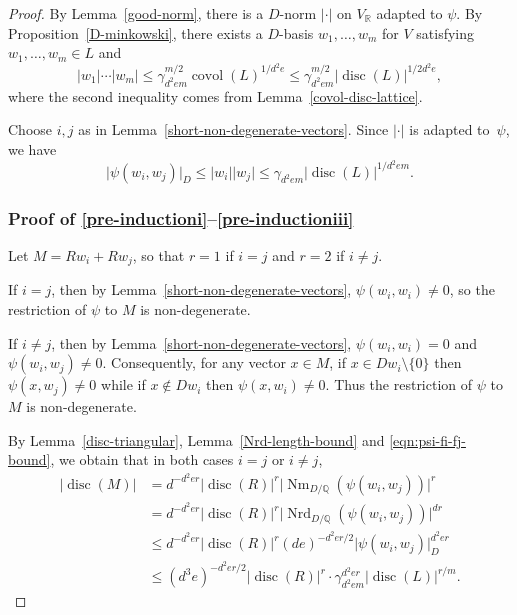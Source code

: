 \documentclass[11pt]{article}
\numberwithin{equation}{section}
\newcommand{\bQ}{\mathbb{Q}}
\newcommand{\bR}{\mathbb{R}}
\DeclareMathOperator{\covol}{covol}
\DeclareMathOperator{\disc}{disc}
\DeclareMathOperator{\Nm}{Nm}
\DeclareMathOperator{\Nrd}{Nrd}
\newcommand{\abs}[1]{\lvert #1 \rvert}
\begin{document}
\begin{proof}
By Lemma~\ref{good-norm}, there is a $D$-norm $\abs{\cdot}$ on $V_\bR$ adapted to $\psi$.
By Proposition~\ref{D-minkowski}, there exists a $D$-basis $w_1, \dotsc, w_m$ for $V$ satisfying $w_1, \dotsc, w_m \in L$ and\vspace*{-3pt}
\[
\abs{w_1} \dotsm \abs{w_m} \leq \gamma_{d^2em}^{m/2} \covol(L)^{1/d^2e} \leq \gamma_{d^2em}^{m/2} \abs{\disc(L)}^{1/2d^2e},
\]
where the second inequality comes from Lemma~\ref{covol-disc-lattice}.

Choose $i, j$ as in Lemma~\ref{short-non-degenerate-vectors}.
Since $\abs{\cdot}$ is adapted to~$\psi$, we have\vspace*{-3pt}
\begin{equation} \label{eqn:psi-fi-fj-bound}
\abs{\psi(w_i, w_j)}_D \leq \abs{w_i}\abs{w_j} \leq \gamma_{d^2em} \abs{\disc(L)}^{1/d^2em}.
\end{equation}

\subsubsection*{Proof of \eqref{pre-inductioni}--\eqref{pre-inductioniii}}

Let $M = Rw_i + Rw_j$, so that $r=1$ if $i=j$ and $r=2$ if $i \neq j$.

If $i=j$, then by Lemma~\ref{short-non-degenerate-vectors}, $\psi(w_i, w_i) \neq 0$, so the restriction of $\psi$ to $M$ is non-degenerate.

If $i \neq j$, then by Lemma~\ref{short-non-degenerate-vectors}, $\psi(w_i, w_i) = 0$ and $\psi(w_i, w_j) \neq 0$. Consequently, for any vector $x \in M$, if $x \in Dw_i \setminus \{0\}$ then $\psi(x, w_j) \neq 0$ while if $x \not\in Dw_i$ then $\psi(x, w_i) \neq 0$.
Thus the restriction of $\psi$ to $M$ is non-degenerate.

By Lemma~\ref{disc-triangular}, Lemma~\ref{Nrd-length-bound} and \eqref{eqn:psi-fi-fj-bound}, we obtain that in both cases $i=j$ or $i \neq j$,\vspace*{-3pt}
\begin{align*}
\abs{\disc(M)}
& = d^{-d^2er} \abs{\disc(R)}^r \abs{\Nm_{D/\bQ}(\psi(w_i, w_j))}^r
\\& = d^{-d^2er} \abs{\disc(R)}^r \abs{\Nrd_{D/\bQ}(\psi(w_i, w_j))}^{dr}
\\& \leq d^{-d^2er} \abs{\disc(R)}^r (de)^{-d^2er/2} \abs{\psi(w_i, w_j)}_D^{d^2er}
\\& \leq (d^3e)^{-d^2er/2} \abs{\disc(R)}^r \cdot \gamma_{d^2em}^{d^2er} \abs{\disc(L)}^{r/m}.
\end{align*}


\end{proof}
\end{document}
